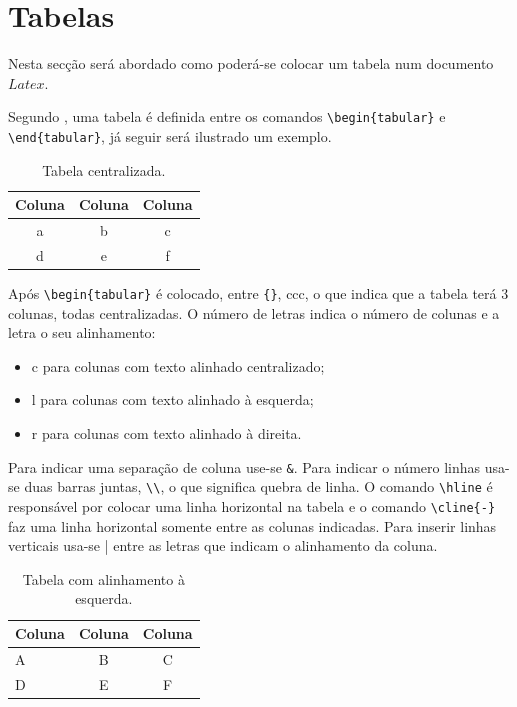 \section{Tabelas}
Nesta secção será abordado como poderá-se colocar um tabela num documento $Latex$.\par
Segundo \cite{overleaftables}, uma tabela é definida entre os comandos \verb|\begin{tabular}| e \verb|\end{tabular}|, já seguir será ilustrado um exemplo.\par
\begin{table}[H]
    \renewcommand{\arraystretch}{1.5}
    \centering
    \caption{Tabela centralizada.}
    \label{tab1}
    \begin{tabular}{ccc}
        \hline
        Coluna  & Coluna  & Coluna \\
        \hline
        a & b & c \\
        d & e & f \\
        \hline
    \end{tabular}
\end{table}\par
Após \verb|\begin{tabular}| é colocado, entre \verb|{}|, ccc, o que indica que a tabela terá 3 colunas, todas centralizadas. O número de letras indica o número de colunas e a letra o seu alinhamento: 
\begin{itemize}
    \item c para colunas com texto alinhado centralizado;
    \item l para colunas com texto alinhado à esquerda;
    \item r para colunas com texto alinhado à direita.
\end{itemize}\par
Para indicar uma separação de coluna use-se \verb|&|. Para indicar o número linhas usa-se duas
barras juntas, \verb|\\|, o que significa quebra de linha. O comando \verb|\hline| é responsável por colocar uma linha horizontal na tabela e o comando \verb|\cline{-}| faz uma linha horizontal somente entre as colunas indicadas. Para inserir linhas verticais usa-se \verb||| entre as letras que indicam o alinhamento da coluna.
\begin{table}[H]
    \renewcommand{\arraystretch}{1.5}
    \centering
    \caption{Tabela com alinhamento à esquerda.}
    \label{tab2}
    \begin{tabular}{|l|cc|}
    \hline
    Coluna & Coluna  & Coluna \\
    \hline \hline
    A & B & C \\
    \cline{2-3}
    D & E & F \\
    \hline
    \end{tabular}
\end{table}\par 
